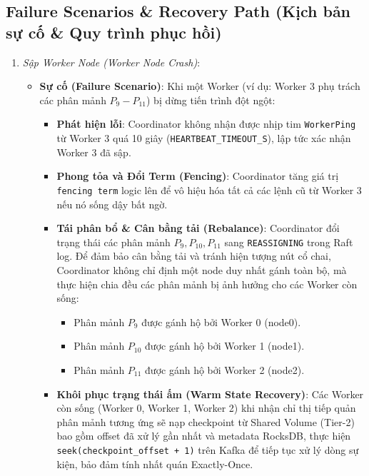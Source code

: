 \documentclass[12pt,a4paper]{article}
\begin{document}
\subsection{Failure Scenarios \& Recovery Path (Kịch bản sự cố \& Quy trình phục hồi)}
\begin{enumerate}
        \item \textit{Sập Worker Node (Worker Node Crash)}:
        \begin{itemize}[label={-}]
            \item \textbf{Sự cố (Failure Scenario)}: Khi một Worker (ví dụ: Worker 3 phụ trách các phân mảnh $P_9 - P_{11}$) bị dừng tiến trình đột ngột:
            \begin{itemize}
                \item \textbf{Phát hiện lỗi}: Coordinator không nhận được nhịp tim \texttt{WorkerPing} từ Worker 3 quá 10 giây (\texttt{HEARTBEAT\_TIMEOUT\_S}), lập tức xác nhận Worker 3 đã sập.
                \item \textbf{Phong tỏa và Đổi Term (Fencing)}: Coordinator tăng giá trị \texttt{fencing term} logic lên để vô hiệu hóa tất cả các lệnh cũ từ Worker 3 nếu nó sống dậy bất ngờ.
                \item \textbf{Tái phân bổ \& Cân bằng tải (Rebalance)}: Coordinator đổi trạng thái các phân mảnh $P_9, P_{10}, P_{11}$ sang \texttt{REASSIGNING} trong Raft log. Để đảm bảo cân bằng tải và tránh hiện tượng nút cổ chai, Coordinator không chỉ định một node duy nhất gánh toàn bộ, mà thực hiện chia đều các phân mảnh bị ảnh hưởng cho các Worker còn sống:
                \begin{itemize}[label={-}]
                    \item Phân mảnh $P_9$ được gánh hộ bởi Worker 0 (node0).
                    \item Phân mảnh $P_{10}$ được gánh hộ bởi Worker 1 (node1).
                    \item Phân mảnh $P_{11}$ được gánh hộ bởi Worker 2 (node2).
                \end{itemize}
                \item \textbf{Khôi phục trạng thái ấm (Warm State Recovery)}: Các Worker còn sống (Worker 0, Worker 1, Worker 2) khi nhận chỉ thị tiếp quản phân mảnh tương ứng sẽ nạp checkpoint từ Shared Volume (Tier-2) bao gồm offset đã xử lý gần nhất và metadata RocksDB, thực hiện \texttt{seek(checkpoint\_offset + 1)} trên Kafka để tiếp tục xử lý dòng sự kiện, bảo đảm tính nhất quán Exactly-Once.
            \end{itemize}

\end{itemize}
\end{enumerate}
\end{document}
